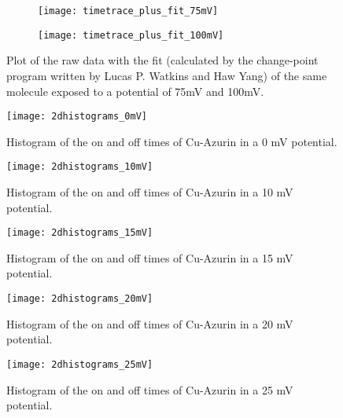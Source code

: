 \documentclass[twoside,single]{lion-msc}
\begin{document}
\begin{figure}
\centering
   \begin{subfigure}[b]{1\textwidth}
   \texttt{[image: timetrace\_plus\_fit\_75mV]}

\end{subfigure}

\begin{subfigure}[b]{1\textwidth}
   \texttt{[image: timetrace\_plus\_fit\_100mV]}

\end{subfigure}

\caption{Plot of the raw data with the fit (calculated by the change-point program written by Lucas P. Watkins and Haw Yang) of the same molecule exposed to a potential of 75mV and 100mV.}
\label{75-100mV}
\end{figure}




\iffalse

\begin{figure}
\centering
\texttt{[image: 2dhistograms\_0mV]}
\caption{Histogram of the on and off times of Cu-Azurin in a 0 mV potential.}
\label{2dhistograms_00mV}
\end{figure}

\begin{figure}
\centering
\texttt{[image: 2dhistograms\_10mV]}
\caption{Histogram of the on and off times of Cu-Azurin in a 10 mV potential.}
\label{2dhistograms_0mV}
\end{figure}

\begin{figure}
\centering
\texttt{[image: 2dhistograms\_15mV]}
\caption{Histogram of the on and off times of Cu-Azurin in a 15 mV potential.}
\label{2dhistograms_0mV}
\end{figure}

\begin{figure}
\centering
\texttt{[image: 2dhistograms\_20mV]}
\caption{Histogram of the on and off times of Cu-Azurin in a 20 mV potential.}
\label{2dhistograms_0mV}
\end{figure}

\begin{figure}
\centering
\texttt{[image: 2dhistograms\_25mV]}
\caption{Histogram of the on and off times of Cu-Azurin in a 25 mV potential.}
\label{2dhistograms_0mV}
\end{figure}
\end{document}
